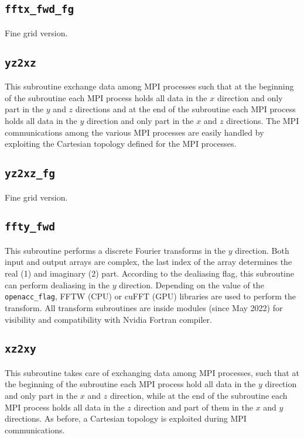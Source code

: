 \subsection{\texttt{fftx\_fwd\_fg}}
\label{sec: fftx}
Fine grid version.

\subsection{\texttt{yz2xz}}
This subroutine exchange data among MPI processes such that at the beginning of the subroutine each MPI process holds all data in the $x$ direction and only part in the $y$ and $z$ directions and at the end of the subroutine each MPI process holds all data in the $y$ direction and only part in the $x$ and $z$ directions. The MPI communications among the various MPI processes are easily handled by exploiting the Cartesian topology defined for the MPI processes.

\subsection{\texttt{yz2xz\_fg}}
Fine grid version.

\subsection{\texttt{ffty\_fwd}}
This subroutine performs a discrete Fourier transforms in the $y$ direction. Both input and output arrays are complex, the last index of the array determines the real (1) and imaginary (2) part. According to the dealiasing flag, this subroutine can perform dealiasing in the $y$ direction.
Depending on the value of the \texttt{openacc\_flag}, FFTW (CPU) or cuFFT (GPU) libraries are used to perform the transform.
All transform subroutines are inside modules (since May 2022) for visibility and compatibility with Nvidia Fortran compiler.


\subsection{\texttt{xz2xy}}
This subroutine takes care of exchanging data among MPI processes, such that at the beginning of the subroutine each MPI process hold all data in the $y$ direction and only part in the $x$ and $z$ direction, while at the end of the subroutine each MPI process holds all data in the $z$ direction and part of them in the $x$ and $y$ directions. As before, a Cartesian topology is exploited during MPI communications.

